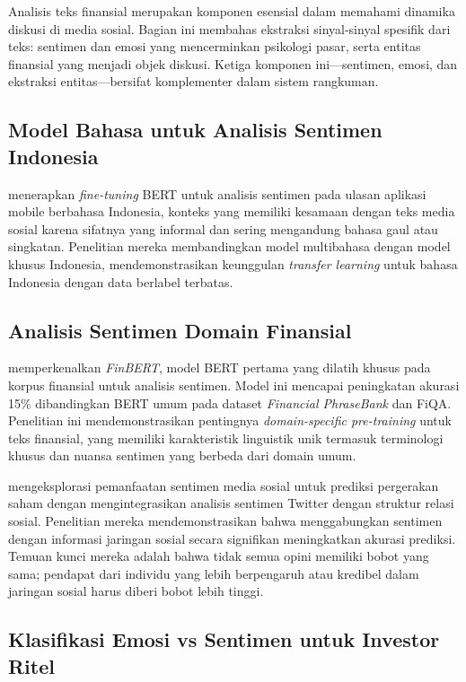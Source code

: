 Analisis teks finansial merupakan komponen esensial dalam memahami dinamika diskusi di media sosial. Bagian ini membahas ekstraksi sinyal-sinyal spesifik dari teks: sentimen dan emosi yang mencerminkan psikologi pasar, serta entitas finansial yang menjadi objek diskusi. Ketiga komponen ini—sentimen, emosi, dan ekstraksi entitas—bersifat komplementer dalam sistem rangkuman.

\subsection{Model Bahasa untuk Analisis Sentimen Indonesia}

\textcite{nugroho2021} menerapkan \textit{fine-tuning} BERT untuk analisis sentimen pada ulasan aplikasi mobile berbahasa Indonesia, konteks yang memiliki kesamaan dengan teks media sosial karena sifatnya yang informal dan sering mengandung bahasa gaul atau singkatan. Penelitian mereka membandingkan model multibahasa dengan model khusus Indonesia, mendemonstrasikan keunggulan \textit{transfer learning} untuk bahasa Indonesia dengan data berlabel terbatas.

\subsection{Analisis Sentimen Domain Finansial}

\textcite{araci2019} memperkenalkan \textit{FinBERT}, model BERT pertama yang dilatih khusus pada korpus finansial untuk analisis sentimen. Model ini mencapai peningkatan akurasi 15\% dibandingkan BERT umum pada dataset \textit{Financial PhraseBank} dan FiQA. Penelitian ini mendemonstrasikan pentingnya \textit{domain-specific pre-training} untuk teks finansial, yang memiliki karakteristik linguistik unik termasuk terminologi khusus dan nuansa sentimen yang berbeda dari domain umum.

\textcite{si2014} mengeksplorasi pemanfaatan sentimen media sosial untuk prediksi pergerakan saham dengan mengintegrasikan analisis sentimen Twitter dengan struktur relasi sosial. Penelitian mereka mendemonstrasikan bahwa menggabungkan sentimen dengan informasi jaringan sosial secara signifikan meningkatkan akurasi prediksi. Temuan kunci mereka adalah bahwa tidak semua opini memiliki bobot yang sama; pendapat dari individu yang lebih berpengaruh atau kredibel dalam jaringan sosial harus diberi bobot lebih tinggi.

\subsection{Klasifikasi Emosi vs Sentimen untuk Investor Ritel}

